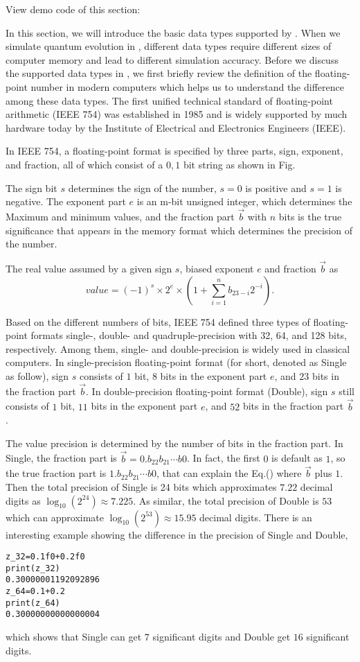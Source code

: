 View demo code of this section: 

In this section, we will introduce the basic data types supported by \MindQuantum. When we simulate quantum evolution in \MindQuantum, different data types require different sizes of computer memory and lead to different simulation accuracy.
Before we discuss the supported data types in \MindQuantum, we first briefly review the definition of the floating-point number in modern computers which helps us to understand the difference among these data types.
The first unified technical standard of floating-point arithmetic (IEEE 754) was established in 1985 and is widely supported by much hardware today by the Institute of Electrical and Electronics Engineers (IEEE).

In IEEE 754, a floating-point format is specified by three parts, sign, exponent, and fraction, all of which consist of a ${0,1}$ bit string as shown in Fig.

The sign bit $s$ determines the sign of the number, $s=0$ is positive and $s=1$ is negative.
The exponent part $e$ is an m-bit unsigned integer, which determines the Maximum and minimum values, and the fraction part $\vec{b}$ with $n$ bits is the true significance that appears in the memory format which determines the precision of the number.

The real value assumed by a given sign $s$, biased exponent $e$ and fraction $\vec{b}$ as
\begin{equation}
    value = (-1)^{s}\times 2^{e}\times (1+\sum_{i=1}^nb_{23-i}2^{-i}).
\end{equation}

Based on the different numbers of bits, IEEE 754 defined three types of floating-point formats single-, double- and quadruple-precision with 32, 64, and 128 bits, respectively.
Among them, single- and double-precision is widely used in classical computers.
In single-precision floating-point format (for short, denoted as Single as follow), sign $s$ consists of $1$ bit, $8$ bits in the exponent part $e$, and $23$ bits in the fraction part $\vec{b}$.
In double-precision floating-point format (Double), sign $s$ still consists of $1$ bit, $11$ bits in the exponent part $e$, and $52$ bits in the fraction part $\vec{b}$.

The value precision is determined by the number of bits in the fraction part.
In Single, the fraction part is $\vec{b}=0.b_{22}b_{21}\cdots b{0}$.
In fact, the first $0$ is default as $1$, so the true fraction part is $1.b_{22}b_{21}\cdots b{0}$, that can explain the Eq.() where $\vec{b}$ plus $1$.
Then the total precision of Single is 24 bits which approximates $7.22$ decimal digits as $\log_{10}(2^{24}) \approx 7.225$.
As similar, the total precision of Double is $53$ which can approximate $\log_{10}(2^{53}) \approx 15.95$ decimal digits.
There is an interesting example showing the difference in the precision of Single and Double,
\begin{lstlisting}
z_32=0.1f0+0.2f0
print(z_32)
0.30000001192092896
z_64=0.1+0.2
print(z_64)
0.30000000000000004
\end{lstlisting}
which shows that Single can get $7$ significant digits and Double get $16$ significant digits.


